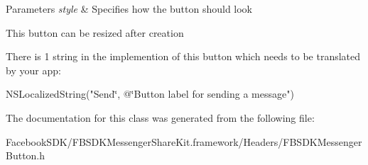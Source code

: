 \begin{DoxyParams}{Parameters}
{\em style} & Specifies how the button should look\\
\hline
\end{DoxyParams}
This button can be resized after creation

There is 1 string in the implemention of this button which needs to be translated by your app\-:

N\-S\-Localized\-String("Send\char`\"{}, @\char`\"{}Button label for sending a message") 

The documentation for this class was generated from the following file\-:\begin{DoxyCompactItemize}
\item 
Facebook\-S\-D\-K/\-F\-B\-S\-D\-K\-Messenger\-Share\-Kit.\-framework/\-Headers/F\-B\-S\-D\-K\-Messenger\-Button.\-h\end{DoxyCompactItemize}
